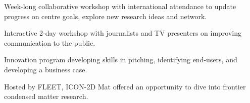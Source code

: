 \documentclass[10pt,a4paper,ragged2e,withhyper]{altacv}
\begin{document}
		Week-long collaborative workshop with international attendance to update progress on centre goals, explore new research ideas and network.
		
		\divider
		
		Interactive 2-day workshop with journalists and TV presenters on improving communication to the public.
		
		\divider
		
		\vspace{-0.3em}
		
		\divider
		
		Innovation program developing skills in pitching, identifying end-users, and developing a business case.
		
		\divider
		
%		
%		
		Hosted by FLEET, ICON-2D Mat offered an opportunity to dive into frontier condensed matter research.
		
		\divider
		\newpage
%		
%		
%		
		
		
	
\end{document}

